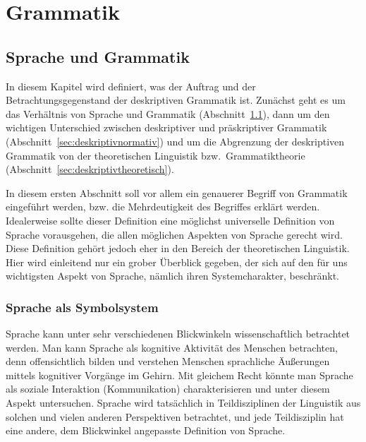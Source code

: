 \chapter{Grammatik}

\label{sec:grammatik}


\section{Sprache und Grammatik}

\label{sec:spracheundgrammatik}

In diesem Kapitel wird definiert, was der Auftrag und der Betrachtungsgegenstand der deskriptiven Grammatik ist.
Zunächst geht es um das Verhältnis von Sprache und Grammatik (Abschnitt~\ref{sec:spracheundgrammatik}), dann um den wichtigen Unterschied zwischen deskriptiver und präskriptiver Grammatik (Abschnitt~\ref{sec:deskriptivnormativ}) und um die Abgrenzung der deskriptiven Grammatik von der theoretischen Linguistik bzw.\ Grammatiktheorie (Abschnitt~\ref{sec:deskriptivtheoretisch}).

In diesem ersten Abschnitt soll vor allem ein genauerer Begriff von Grammatik eingeführt werden, bzw. die Mehrdeutigkeit des Begriffes erklärt werden.
Idealerweise sollte dieser Definition eine möglichst universelle Definition von Sprache vorausgehen, die allen möglichen Aspekten von Sprache gerecht wird.
Diese Definition gehört jedoch eher in den Bereich der theoretischen Linguistik.
Hier wird einleitend nur ein grober Überblick gegeben, der sich auf den für uns wichtigsten Aspekt von Sprache, nämlich ihren Systemcharakter, beschränkt.

\subsection{Sprache als Symbolsystem}

\label{sec:sprachsystem}


Sprache kann unter sehr verschiedenen Blickwinkeln wissenschaftlich betrachtet werden.
Man kann Sprache als kognitive Aktivität des Menschen betrachten, denn offensichtlich bilden und verstehen Menschen sprachliche Äußerungen mittels kognitiver Vorgänge im Gehirn.
Mit gleichem Recht könnte man Sprache als soziale Interaktion (Kommunikation) charakterisieren und unter diesem Aspekt untersuchen.
Sprache wird tatsächlich in Teildisziplinen der Linguistik aus solchen und vielen anderen Perspektiven betrachtet, und jede Teildisziplin hat eine andere, dem Blickwinkel angepasste Definition von Sprache.

